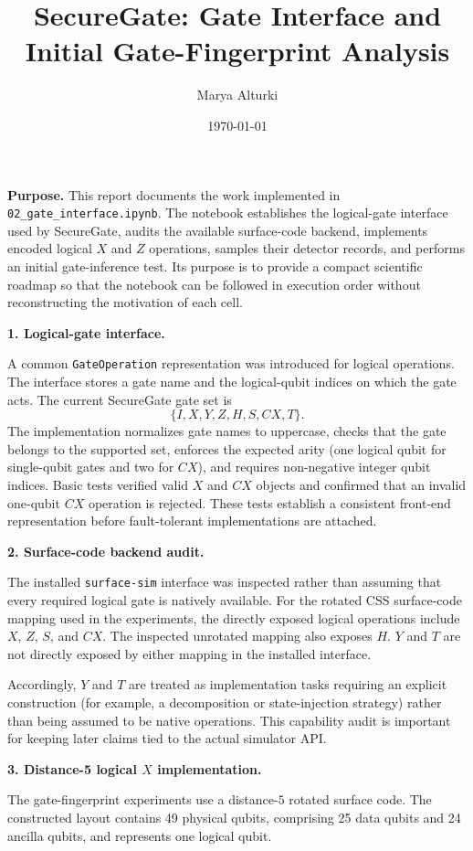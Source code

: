 \documentclass[10pt,a4paper]{article}
\title{\textbf{SecureGate: Gate Interface and Initial Gate-Fingerprint Analysis}}
\author{Marya Alturki}
\date{\today}
\begin{document}
\maketitle

\textbf{Purpose.}
This report documents the work implemented in \texttt{02\_gate\_interface.ipynb}.
The notebook establishes the logical-gate interface used by SecureGate, audits the
available surface-code backend, implements encoded logical \(X\) and \(Z\) operations,
samples their detector records, and performs an initial gate-inference test. Its
purpose is to provide a compact scientific roadmap so that the notebook can be
followed in execution order without reconstructing the motivation of each cell.

\textbf{1. Logical-gate interface.}

A common \texttt{GateOperation} representation was introduced for logical
operations. The interface stores a gate name and the logical-qubit indices on which
the gate acts. The current SecureGate gate set is
\[
\{I,X,Y,Z,H,S,CX,T\}.
\]
The implementation normalizes gate names to uppercase, checks that the gate belongs
to the supported set, enforces the expected arity (one logical qubit for
single-qubit gates and two for \(CX\)), and requires non-negative integer qubit
indices. Basic tests verified valid \(X\) and \(CX\) objects and confirmed that an
invalid one-qubit \(CX\) operation is rejected. These tests establish a consistent
front-end representation before fault-tolerant implementations are attached.

\textbf{2. Surface-code backend audit.}

The installed \texttt{surface-sim} interface was inspected rather than assuming
that every required logical gate is natively available. For the rotated CSS
surface-code mapping used in the experiments, the directly exposed logical
operations include \(X\), \(Z\), \(S\), and \(CX\). The inspected unrotated mapping
also exposes \(H\). \(Y\) and \(T\) are not directly exposed by either mapping in
the installed interface.

Accordingly, \(Y\) and \(T\) are treated as implementation tasks requiring an
explicit construction (for example, a decomposition or state-injection strategy)
rather than being assumed to be native operations. This capability audit is
important for keeping later claims tied to the actual simulator API.

\textbf{3. Distance-5 logical \(X\) implementation.}

The gate-fingerprint experiments use a distance-\(5\) rotated surface code. The
constructed layout contains 49 physical qubits, comprising 25 data qubits and
24 ancilla qubits, and represents one logical qubit.
\end{document}
